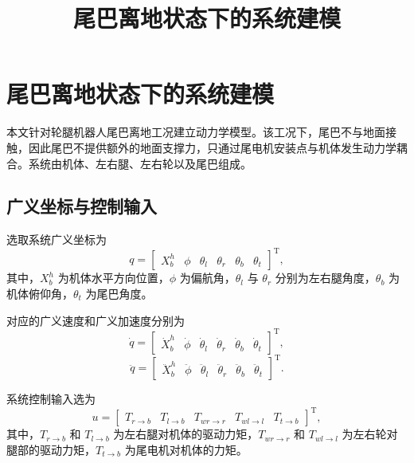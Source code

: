 \documentclass[UTF8,a4paper,12pt]{ctexart}
\title{尾巴离地状态下的系统建模}
\author{}
\date{}
\begin{document}
\maketitle

\section{尾巴离地状态下的系统建模}

本文针对轮腿机器人尾巴离地工况建立动力学模型。该工况下，尾巴不与地面接触，因此尾巴不提供额外的地面支撑力，只通过尾电机安装点与机体发生动力学耦合。系统由机体、左右腿、左右轮以及尾巴组成。

\subsection{广义坐标与控制输入}

选取系统广义坐标为
\begin{equation}
    q =
    \begin{bmatrix}
        X_b^h & \phi & \theta_l & \theta_r & \theta_b & \theta_t
    \end{bmatrix}^{\mathrm T},
\end{equation}
其中，$X_b^h$ 为机体水平方向位置，$\phi$ 为偏航角，$\theta_l$ 与 $\theta_r$ 分别为左右腿角度，$\theta_b$ 为机体俯仰角，$\theta_t$ 为尾巴角度。

对应的广义速度和广义加速度分别为
\begin{equation}
    \dot q =
    \begin{bmatrix}
        \dot X_b^h & \dot \phi & \dot \theta_l & \dot \theta_r & \dot \theta_b & \dot \theta_t
    \end{bmatrix}^{\mathrm T},
\end{equation}
\begin{equation}
    \ddot q =
    \begin{bmatrix}
        \ddot X_b^h & \ddot \phi & \ddot \theta_l & \ddot \theta_r & \ddot \theta_b & \ddot \theta_t
    \end{bmatrix}^{\mathrm T}.
\end{equation}

系统控制输入选为
\begin{equation}
    u =
    \begin{bmatrix}
        T_{r \to b} &
        T_{l \to b} &
        T_{wr \to r} &
        T_{wl \to l} &
        T_{t \to b}
    \end{bmatrix}^{\mathrm T},
\end{equation}
其中，$T_{r \to b}$ 和 $T_{l \to b}$ 为左右腿对机体的驱动力矩，$T_{wr \to r}$ 和 $T_{wl \to l}$ 为左右轮对腿部的驱动力矩，$T_{t \to b}$ 为尾电机对机体的力矩。
\end{document}
